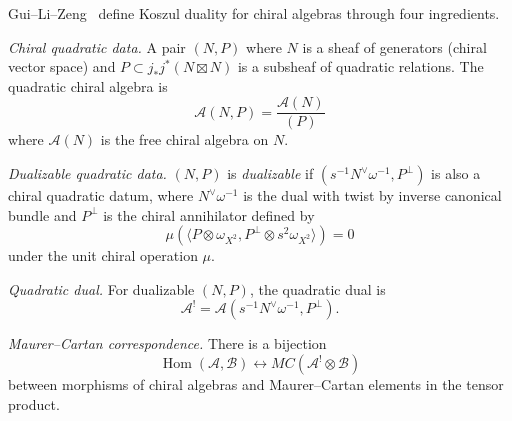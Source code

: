 \begin{definition}
\label{def:glz}
Gui--Li--Zeng~\cite{GLZ22} define Koszul duality for chiral algebras through four ingredients.

\emph{Chiral quadratic data.}
A pair $(N, P)$ where $N$ is a sheaf of generators (chiral vector space) and $P \subset j_* j^* (N \boxtimes N)$ is a subsheaf of quadratic relations.
The quadratic chiral algebra is
\[\mathcal{A}(N, P) = \frac{\mathcal{A}(N)}{(P)}\]
where $\mathcal{A}(N)$ is the free chiral algebra on $N$.

\emph{Dualizable quadratic data.}
$(N, P)$ is \emph{dualizable} if $(s^{-1}N^{\vee}\omega^{-1}, P^{\perp})$ is also a chiral
quadratic datum, where $N^{\vee}\omega^{-1}$ is the dual with twist by inverse canonical bundle and $P^{\perp}$ is the chiral annihilator defined by
\[\mu(\langle P \otimes \omega_{X^2}, P^{\perp} \otimes s^2\omega_{X^2}\rangle) = 0\]
under the unit chiral operation $\mu$.

\emph{Quadratic dual.}
For dualizable $(N, P)$, the quadratic dual is
\[\mathcal{A}^! = \mathcal{A}(s^{-1}N^{\vee}\omega^{-1}, P^{\perp}).\]

\emph{Maurer--Cartan correspondence.}
There is a bijection
\[\operatorname{Hom}(\mathcal{A}, \mathcal{B}) \leftrightarrow MC(\mathcal{A}^! \otimes \mathcal{B})\]
between morphisms of chiral algebras and Maurer--Cartan elements in the tensor product.
\end{definition}


